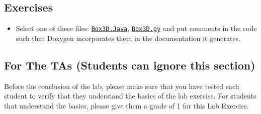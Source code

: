 \documentclass[12pt,fleqn]{article}
\newcommand{\bi}{\begin{itemize}}
\newcommand{\ei}{\end{itemize}}
\begin{document}
\subsection*{Exercises}
\bi
\item Select one of these files: \href{https://gitlab.cas.mcmaster.ca/smiths/se3xa3/blob/master/Labs/L07/Box3D.java}{\texttt{Box3D.Java}}, \href{https://gitlab.cas.mcmaster.ca/smiths/se3xa3/blob/master/Labs/L07/Box3D.py}{\texttt{Box3D.py}} and put comments in the code such
that Doxygen incorporates them in the documentation it generates.
\ei
\subsection*{For The TAs (Students can ignore this section)}
Before the conclusion of the lab, please make sure that you have tested each
student
to verify that they understand the basics of the lab exercise.  For students
that understand the basics, please give them a grade of 1 for this Lab
Exercise.
\end{document}
